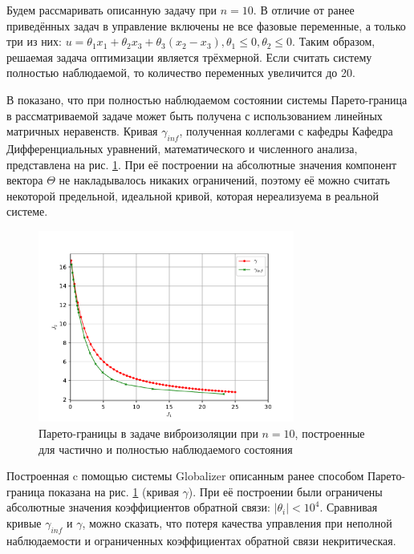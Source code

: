 Будем рассмаривать описанную задачу при \(n=10\). В отличие от ранее приведённых задач в управление
включены не все фазовые переменные, а только три из них: \(u=\theta_1 x_1 + \theta_2 x_3 + \theta_3(x_2-x_3), \theta_1 \leqslant 0, \theta_2\leqslant 0\).
Таким образом, решаемая задача оптимизации является трёхмерной. Если считать систему
полностью наблюдаемой, то количество переменных увеличится до 20.

В \cite{optControl} показано, что при полностью наблюдаемом состоянии системы Парето-граница
в рассматриваемой задаче может быть получена с использованием линейных матричных
неравенств. Кривая \(\gamma_{inf}\), полученная коллегами с кафедры Кафедра Дифференциальных уравнений, математического и численного анализа,
представлена на рис. \ref{fig:pareto}. При её построении на абсолютные значения компонент
вектора \(\Theta\) не накладывалось никаких ограничений, поэтому её можно считать
некоторой предельной, идеальной кривой, которая нереализуема в реальной системе.

\begin{figure}[ht]
    \center
    \includegraphics[width=0.75\textwidth]{images/solution.pdf}
    \caption{Парето-границы в задаче виброизоляции при \(n=10\), построенные для
    частично и полностью наблюдаемого состояния}
    \label{fig:pareto}
\end{figure}

Построенная c помощью системы Globalizer описанным ранее способом Парето-граница
показана на рис. \ref{fig:pareto} (кривая \(\gamma\)). При её построении были ограничены
абсолютные значения коэффициентов обратной связи: \(|\theta_i|<10^4\). Сравнивая
кривые \(\gamma_{inf}\) и \(\gamma\), можно сказать, что потеря качества управления при неполной наблюдаемости
и ограниченных коэффициентах обратной связи некритическая.
